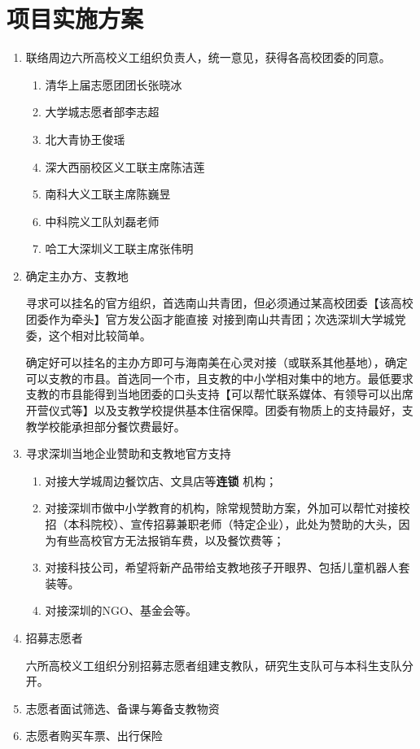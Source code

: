 \documentclass[12pt]{ctexart}
\begin{document}
\section{项目实施方案}
\begin{enumerate}
\item 联络周边六所高校义工组织负责人，统一意见，获得各高校团委的同意。
\begin{enumerate}
\item 清华上届志愿团团长张晓冰 \checkmark
\item 大学城志愿者部李志超 \checkmark 
\item 北大青协王俊瑶 \checkmark 
\item 深大西丽校区义工联主席陈洁莲
\item 南科大义工联主席陈巍昱
\item 中科院义工队刘磊老师
\item 哈工大深圳义工联主席张伟明
\end{enumerate}
\item 确定主办方、支教地

寻求可以挂名的官方组织，首选南山共青团，但必须通过某高校团委【该高校团委作为牵头】官方发公函才能直接
对接到南山共青团；次选深圳大学城党委，这个相对比较简单。

确定好可以挂名的主办方即可与海南美在心灵对接（或联系其他基地），确定可以支教的市县。首选同一个市，且支教的中小学相对集中的地方。最低要求支教的市县能得到当地团委的口头支持【可以帮忙联系媒体、有领导可以出席开营仪式等】以及支教学校提供基本住宿保障。团委有物质上的支持最好，支教学校能承担部分餐饮费最好。

\item 寻求深圳当地企业赞助和支教地官方支持

\begin{enumerate}
\item 对接大学城周边餐饮店、文具店等\textbf{连锁} 机构；
\item 对接深圳市做中小学教育的机构，除常规赞助方案，外加可以帮忙对接校招（本科院校）、宣传招募兼职老师（特定企业），此处为赞助的大头，因为有些高校官方无法报销车费，以及餐饮费等；
\item 对接科技公司，希望将新产品带给支教地孩子开眼界、包括儿童机器人套装等。
\item 对接深圳的NGO、基金会等。
\end{enumerate}
\item 招募志愿者

六所高校义工组织分别招募志愿者组建支教队，研究生支队可与本科生支队分开。

\item 志愿者面试筛选、备课与筹备支教物资

\item 志愿者购买车票、出行保险
\end{enumerate}
\end{document}
